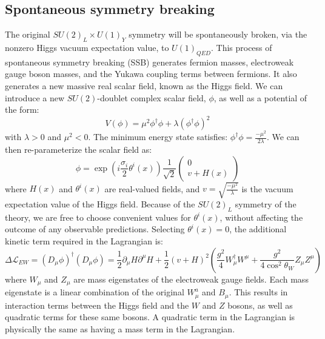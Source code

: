 \subsection{Spontaneous symmetry breaking}\label{subsec:ew_higgs}

The original $SU(2)_{L}\times U(1)_Y$ symmetry will be spontaneously broken, via the nonzero Higgs vacuum expectation value, to $U(1)_{QED}$.
This process of spontaneous symmetry breaking (SSB) generates fermion masses, electroweak gauge boson masses,
and the Yukawa coupling terms between fermions.
It also generates a new massive real scalar field, known as the Higgs field.
We can introduce a new $SU(2)$-doublet complex scalar field, $\phi$, as well as a potential of the form:
\begin{equation}\label{eq:higgs_potential}
    V(\phi) = \mu^2 \phi^\dagger\phi + \lambda(\phi^\dagger\phi)^2
\end{equation}
with $\lambda > 0$ and $\mu^2 <0$.
The minimum energy state satisfies: $\phi^\dagger\phi = \frac{-\mu^2}{2\lambda}$.
We can then re-parameterize the scalar field as:
\begin{equation}\label{eq:higgs_param}
    \phi = \exp{\left(i\frac{\sigma_i}{2}\theta^i(x)\right)}\frac{1}{\sqrt{2}}\begin{pmatrix} 0 \\ v+H(x) \end{pmatrix}
\end{equation}
where $H(x)$ and $\theta^i(x)$ are real-valued fields, and $v = \sqrt{\frac{-\mu^2}{\lambda}}$ is the vacuum expectation value of the Higgs field.
Because of the $SU(2)_L$ symmetry of the theory, we are free to choose convenient values for $\theta^i(x)$,
without affecting the outcome of any observable predictions.
Selecting $\theta^i(x) = 0$, the additional kinetic term required in the Lagrangian is:
\begin{equation}\label{eq:higgs_kinetic}
    \Delta\mathcal{L}_{EW} = \left(D_{\mu}\phi\right)^{\dagger}\left(D_{\mu}\phi\right)
    =\frac{1}{2}\partial_{\mu}H \partial^{\mu}H + \frac{1}{2}(v+H)^{2}\left(\frac{g^2}{4}W_\mu^\dagger W^\mu
    + \frac{g^2}{4\cos^2 {\theta_W}}Z_\mu Z^\mu\right)
\end{equation}
where $W_\mu$ and $Z_\mu$ are mass eigenstates of the electroweak gauge fields.
Each mass eigenstate is a linear combination of the original $W_\mu^a$ and $B_\mu$.
This results in interaction terms between the Higgs field and the $W$ and $Z$ bosons, as well as quadratic terms for these same bosons.
A quadratic term in the Lagrangian is physically the same as having a mass term in the Lagrangian.
